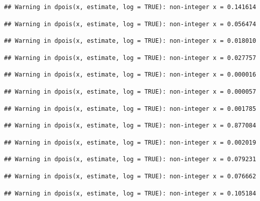 \documentclass[]{article}
\begin{document}
\begin{verbatim}
## Warning in dpois(x, estimate, log = TRUE): non-integer x = 0.141614
\end{verbatim}

\begin{verbatim}
## Warning in dpois(x, estimate, log = TRUE): non-integer x = 0.056474
\end{verbatim}

\begin{verbatim}
## Warning in dpois(x, estimate, log = TRUE): non-integer x = 0.018010
\end{verbatim}

\begin{verbatim}
## Warning in dpois(x, estimate, log = TRUE): non-integer x = 0.027757
\end{verbatim}

\begin{verbatim}
## Warning in dpois(x, estimate, log = TRUE): non-integer x = 0.000016
\end{verbatim}

\begin{verbatim}
## Warning in dpois(x, estimate, log = TRUE): non-integer x = 0.000057
\end{verbatim}

\begin{verbatim}
## Warning in dpois(x, estimate, log = TRUE): non-integer x = 0.001785
\end{verbatim}

\begin{verbatim}
## Warning in dpois(x, estimate, log = TRUE): non-integer x = 0.877084
\end{verbatim}

\begin{verbatim}
## Warning in dpois(x, estimate, log = TRUE): non-integer x = 0.002019
\end{verbatim}

\begin{verbatim}
## Warning in dpois(x, estimate, log = TRUE): non-integer x = 0.079231
\end{verbatim}

\begin{verbatim}
## Warning in dpois(x, estimate, log = TRUE): non-integer x = 0.076662
\end{verbatim}

\begin{verbatim}
## Warning in dpois(x, estimate, log = TRUE): non-integer x = 0.105184
\end{verbatim}
\end{document}
